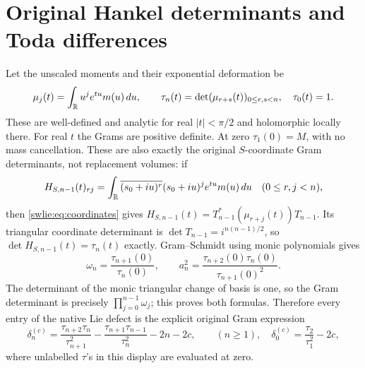 \section{Original Hankel determinants and Toda differences}

Let the unscaled moments and their exponential deformation be
\begin{equation}\label{swlie:eq:tau}
 \mu_j(t)=\int_\mathbb R u^je^{tu}m(u)\,du,\qquad
 \tau_n(t)=\det(\mu_{r+s}(t))_{0\leq r,s<n},\quad \tau_0(t)=1 .
\end{equation}
These are well-defined and analytic for real $|t|<\pi/2$
and holomorphic locally there. For real $t$ the Grams are
positive definite. At zero $\tau_1(0)=M$, with no mass
cancellation. These are also exactly the original
$S$-coordinate Gram determinants, not replacement volumes:
if
\[
 H_{S,n-1}(t)_{rj}
 =\int_\mathbb R\overline{(s_0+iu)^r}(s_0+iu)^j e^{tu}m(u)\,du
 \quad(0\leq r,j<n),
\]
then \eqref{swlie:eq:coordinates} gives
$H_{S,n-1}(t)=T_{n-1}^*(\mu_{r+j}(t))T_{n-1}$.
Its triangular coordinate determinant is
$\det T_{n-1}=i^{n(n-1)/2}$, so
$\det H_{S,n-1}(t)=\tau_n(t)$ exactly.
Gram--Schmidt using monic polynomials gives
\begin{equation}\label{swlie:eq:hankelratios}
 \omega_n=\frac{\tau_{n+1}(0)}{\tau_n(0)},\qquad
 a_n^2=\frac{\tau_{n+2}(0)\tau_n(0)}{\tau_{n+1}(0)^2}.
\end{equation}
The determinant of the monic triangular change of basis is
one, so the Gram determinant is precisely
$\prod_{j=0}^{n-1}\omega_j$; this proves both formulas.
Therefore every entry of the native Lie defect is the
explicit original Gram expression
\begin{equation}\label{swlie:eq:hankeldefect}
 \delta_n^{(c)}
  =\frac{\tau_{n+2}\tau_n}{\tau_{n+1}^2}
    -\frac{\tau_{n+1}\tau_{n-1}}{\tau_n^2}-2n-2c,
 \qquad (n\geq1),
 \quad \delta_0^{(c)}=\frac{\tau_2}{\tau_1^2}-2c,
\end{equation}
where unlabelled $\tau$'s in this display are evaluated at zero.

